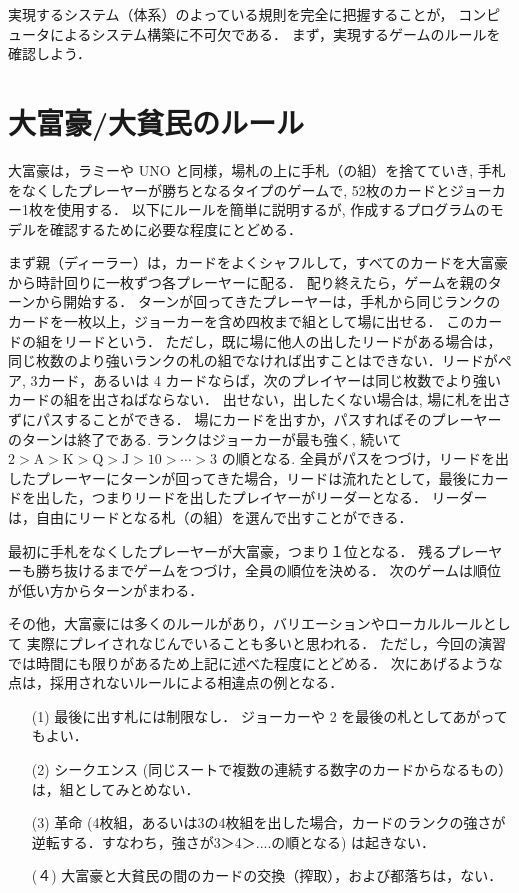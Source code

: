 実現するシステム（体系）のよっている規則を完全に把握することが，
コンピュータによるシステム構築に不可欠である．
まず，実現するゲームのルールを確認しよう．

\section{大富豪/大貧民のルール}

大富豪は，ラミーや UNO と同様，場札の上に手札（の組）を捨てていき, 手札をなくしたプレーヤーが勝ちとなるタイプのゲームで, 52枚のカードとジョーカー1枚を使用する．
以下にルールを簡単に説明するが, 作成するプログラムのモデルを確認するために必要な程度にとどめる．  

まず親（ディーラー）は，カードをよくシャフルして，すべてのカードを大富豪から時計回りに一枚ずつ各プレーヤーに配る．
配り終えたら，ゲームを親のターンから開始する．
ターンが回ってきたプレーヤーは，手札から同じランクのカードを一枚以上，ジョーカーを含め四枚まで組として場に出せる．
このカードの組をリードという．
ただし，既に場に他人の出したリードがある場合は，同じ枚数のより強いランクの札の組でなければ出すことはできない．リードがペア, 3カード，あるいは 4 カードならば，次のプレイヤーは同じ枚数でより強いカードの組を出さねばならない．
出せない，出したくない場合は, 場に札を出さずにパスすることができる．
場にカードを出すか，パスすればそのプレーヤーのターンは終了である. 
ランクはジョーカーが最も強く, 続いて $2 > \mathrm{A} > \mathrm{K} > \mathrm{Q} > \mathrm{J} > 10 > \cdots > 3$ の順となる. 
全員がパスをつづけ，リードを出したプレーヤーにターンが回ってきた場合，リードは流れたとして，最後にカードを出した，つまりリードを出したプレイヤーがリーダーとなる．
リーダーは，自由にリードとなる札（の組）を選んで出すことができる．

最初に手札をなくしたプレーヤーが大富豪，つまり１位となる．
残るプレーヤーも勝ち抜けるまでゲームをつづけ，全員の順位を決める．
次のゲームは順位が低い方からターンがまわる．

その他，大富豪には多くのルールがあり，バリエーションやローカルルールとして
実際にプレイされなじんでいることも多いと思われる．
ただし，今回の演習では時間にも限りがあるため上記に述べた程度にとどめる．
次にあげるような点は，採用されないルールによる相違点の例となる．
\begin{enumerate}
\item[(1)] 最後に出す札には制限なし．
ジョーカーや 2 を最後の札としてあがってもよい．
\item[(2)] シークエンス (同じスートで複数の連続する数字のカードからなるもの）は，組としてみとめない．
\item[(3)] 革命 (4枚組，あるいは3の4枚組を出した場合，カードのランクの強さが逆転する．すなわち，強さが3＞4＞....の順となる) は起きない．
\item[(４)] 大富豪と大貧民の間のカードの交換（搾取），および都落ちは，ない．
\end{enumerate}

